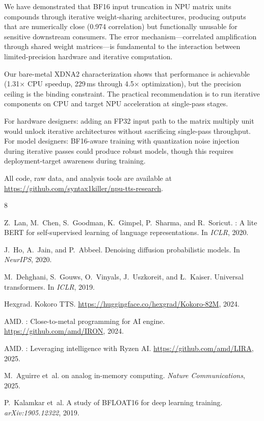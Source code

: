 \documentclass[11pt]{article}
\begin{document}
We have demonstrated that BF16 input truncation in NPU matrix units compounds through iterative weight-sharing architectures, producing outputs that are numerically close (0.974 correlation) but functionally unusable for sensitive downstream consumers. The error mechanism---correlated amplification through shared weight matrices---is fundamental to the interaction between limited-precision hardware and iterative computation.

Our bare-metal XDNA2 characterization shows that performance is achievable (1.31$\times$ CPU speedup, 229\,ms through 4.5$\times$ optimization), but the precision ceiling is the binding constraint. The practical recommendation is to run iterative components on CPU and target NPU acceleration at single-pass stages.

For hardware designers: adding an FP32 input path to the matrix multiply unit would unlock iterative architectures without sacrificing single-pass throughput. For model designers: BF16-aware training with quantization noise injection during iterative passes could produce robust models, though this requires deployment-target awareness during training.

All code, raw data, and analysis tools are available at \url{https://github.com/syntax1killer/npu-tts-research}.

\begin{thebibliography}{8}

Z.~Lan, M.~Chen, S.~Goodman, K.~Gimpel, P.~Sharma, and R.~Soricut.
: A lite {BERT} for self-supervised learning of language representations.
\newblock In \emph{ICLR}, 2020.

J.~Ho, A.~Jain, and P.~Abbeel.
\newblock Denoising diffusion probabilistic models.
\newblock In \emph{NeurIPS}, 2020.

M.~Dehghani, S.~Gouws, O.~Vinyals, J.~Uszkoreit, and {\L}.~Kaiser.
\newblock Universal transformers.
\newblock In \emph{ICLR}, 2019.

Hexgrad.
\newblock Kokoro {TTS}.
\newblock \url{https://huggingface.co/hexgrad/Kokoro-82M}, 2024.

AMD.
: Close-to-metal programming for {AI} engine.
\newblock \url{https://github.com/amd/IRON}, 2024.

AMD.
: Leveraging intelligence with {Ryzen AI}.
\newblock \url{https://github.com/amd/LIRA}, 2025.

M.~Aguirre et~al.
 on analog in-memory computing.
\newblock \emph{Nature Communications}, 2025.

P.~Kalamkar et~al.
\newblock A study of {BFLOAT16} for deep learning training.
\newblock \emph{arXiv:1905.12322}, 2019.

\end{thebibliography}
\end{document}
